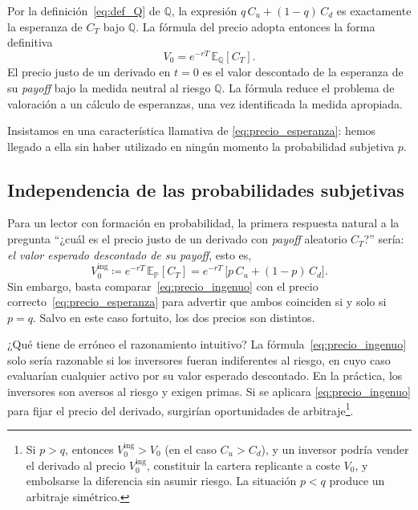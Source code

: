 \documentclass[11pt,a4paper,oneside]{report}
\theoremstyle{plain}
\theoremstyle{definition}
\theoremstyle{remark}
\newcommand{\E}{\mathbb{E}}
\newcommand{\PP}{\mathbb{P}}
\newcommand{\Q}{\mathbb{Q}}
\newcommand{\1}{\mathbf{1}}
\newcommand{\eqdef}{\coloneqq}
\begin{document}
Por
la definición~\eqref{eq:def_Q} de $\Q$, la expresión $q\, C_u + (1-q)\,
C_d$ es exactamente la esperanza de $C_T$ bajo $\Q$. La fórmula del
precio adopta entonces la forma definitiva
\begin{equation}\label{eq:precio_esperanza}
  \boxed{\,V_0 = e^{-rT}\, \E_{\Q}[C_T].\,}
\end{equation}
El precio justo de un derivado en $t = 0$ es el valor descontado de la
esperanza de su \emph{payoff} bajo la medida neutral al riesgo $\Q$. La
fórmula reduce el problema de valoración a un cálculo de esperanzas,
una vez identificada la medida apropiada.

Insistamos en una característica llamativa de
\eqref{eq:precio_esperanza}: hemos llegado a ella sin haber utilizado
en ningún momento la probabilidad subjetiva $p$.

\subsection{Independencia de las probabilidades subjetivas}
\label{subsec:indep_subjetiva}

Para un lector
con formación en probabilidad, la primera respuesta natural a la
pregunta ``¿cuál es el precio justo de un derivado con \emph{payoff}
aleatorio $C_T$?'' sería: \emph{el valor esperado descontado de su
\emph{payoff}}, esto es,
\begin{equation}\label{eq:precio_ingenuo}
  V_0^{\text{ing}} \eqdef e^{-rT}\, \E_{\PP}[C_T]
                  = e^{-rT}\,\bigl[p\, C_u + (1-p)\, C_d\bigr].
\end{equation}
Sin embargo, basta comparar~\eqref{eq:precio_ingenuo} con el precio
correcto~\eqref{eq:precio_esperanza} para advertir que ambos coinciden
si y solo si $p = q$. Salvo en este caso fortuito, los dos precios son
distintos.

¿Qué tiene de erróneo el razonamiento intuitivo? La
fórmula~\eqref{eq:precio_ingenuo} solo sería razonable si los
inversores fueran indiferentes al riesgo, en cuyo caso evaluarían
cualquier activo por su valor esperado descontado. En la práctica, los
inversores son aversos al riesgo y exigen primas. Si se aplicara
\eqref{eq:precio_ingenuo} para fijar el precio del derivado, surgirían
oportunidades de arbitraje\footnote{Si $p > q$, entonces
$V_0^{\text{ing}} > V_0$ (en el caso $C_u > C_d$), y un inversor
podría vender el derivado al precio $V_0^{\text{ing}}$, constituir la
cartera replicante a coste $V_0$, y embolsarse la diferencia sin asumir
riesgo. La situación $p < q$ produce un arbitraje simétrico.}.
\end{document}
